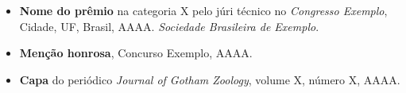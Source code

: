 
\vspace{1em}

\vspace{1em}
\begin{itemize}
    \item \textbf{Nome do prêmio} na categoria X pelo júri técnico no \emph{Congresso Exemplo}, Cidade, UF, Brasil, AAAA. \emph{Sociedade Brasileira de Exemplo}.
    \item \textbf{Menção honrosa}, Concurso Exemplo, AAAA.
    \item \textbf{Capa} do periódico \emph{Journal of Gotham Zoology}, volume X, número X, AAAA.
\end{itemize}
